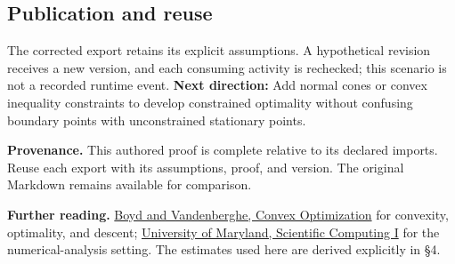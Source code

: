 \documentclass[preprint,12pt,aps,pra,showkeys,amsmath,amssymb,superscriptaddress,floatfix]{revtex4-2}
\theoremstyle{definition}
\theoremstyle{remark}
\begin{document}
\subsection{Publication and reuse}
The corrected export retains its explicit assumptions. A hypothetical
revision receives a new version, and each consuming activity is
rechecked; this scenario is not a recorded runtime event. \textbf{Next
direction:} Add normal cones or convex inequality constraints to develop
constrained optimality without confusing boundary points with
unconstrained stationary points.

\par\medskip\begingroup\small\linespread{1.0}\selectfont\noindent\textbf{Provenance.} This authored proof is complete relative to its declared imports. Reuse
each export with its assumptions, proof, and version. The original
Markdown remains available for comparison.
\par\endgroup

\par\smallskip\begingroup\small\linespread{1.0}\selectfont\noindent\textbf{Further reading.} \href{https://web.stanford.edu/~boyd/cvxbook/}{Boyd and Vandenberghe,
Convex Optimization} for convexity, optimality, and descent;
\href{https://www.math.umd.edu/~mariakc/Spring2020Class.html}{University
of Maryland, Scientific Computing I} for the numerical-analysis setting.
The estimates used here are derived explicitly in §4.\par\endgroup
\end{document}
